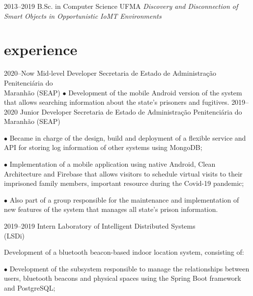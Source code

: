 \documentclass[]{../document-class/twentysecondcv}
\begin{document}
\begin{twenty}
	\twentyitem
		{2013--2019}
		{B.Sc. in Computer Science}
		{UFMA}
		{\emph{Discovery and Disconnection of Smart Objects in Opportunistic IoMT Environments}}
\end{twenty}

\section{experience}

\begin{twenty}
	\twentyitem
		{2020--Now} %
		{Mid-level Developer} %
		{Secretaria de Estado de Administração Penitenciária do \\\hspace*{\fill}Maranhão (SEAP)}
		{$\bullet$ Development of the mobile Android version of the system that allows searching information about the state's prisoners and fugitives.}
	\twentyitem
		{2019--2020} %
		{Junior Developer} %
		{Secretaria de Estado de Administração Penitenciária do \\\hspace*{\fill}Maranhão (SEAP)}
		{$\bullet$ Became in charge of the design, build and deployment of a flexible service and API for storing log information of other systems using MongoDB;\vskip 4pt
			
			$\bullet$ Implementation of a mobile application using native Android, Clean Architecture and Firebase that allows visitors to schedule virtual visits to their imprisoned family members, important resource during the Covid-19 pandemic;\vskip 4pt


		$\bullet$ Also part of a group responsible for the maintenance and implementation of new features of the system that manages all state's prison information.}
		
	\twentyitem
		{2019--2019} %
		{Intern} %
		{Laboratory of Intelligent Distributed Systems \\\hspace*{\fill}(LSDi)}
		{Development of a bluetooth beacon-based indoor location system, consisting of:\vskip 4pt
          
        
		$\bullet$ Development of the subsystem responsible to manage the relationships between users, bluetooth beacons and physical spaces using the Spring Boot framework and PostgreSQL;\vskip 4pt

}
\end{twenty}
\end{document}
